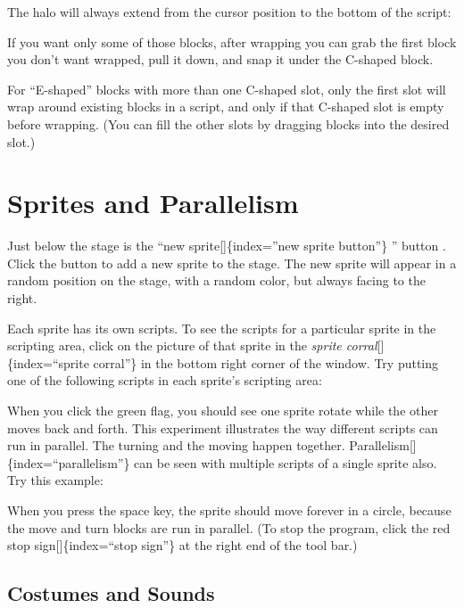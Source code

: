 \documentclass[
  letterpaper,
]{book}
\begin{document}
The halo will always extend from the cursor position to the bottom of
the script:

If you want only some of those blocks, after wrapping you can grab the
first block you don't want wrapped, pull it down, and snap it under the
C-shaped block.

For ``E-shaped'' blocks with more than one C-shaped slot, only the first
slot will wrap around existing blocks in a script, and only if that
C-shaped slot is empty before wrapping. (You can fill the other slots by
dragging blocks into the desired slot.)

\section{\texorpdfstring{\hl{ }Sprites and
Parallelism}{ Sprites and Parallelism}}\label{sprites-and-parallelism}

Just below the stage is the ``new sprite{[}{]}\{index=''new sprite
button''\} '' button . Click the button to add a new sprite to the
stage. The new sprite will appear in a random position on the stage,
with a random color, but always facing to the right.

Each sprite has its own scripts. To see the scripts for a particular
sprite in the scripting area, click on the picture of that sprite in the
\emph{sprite corral}{[}{]}\{index=``sprite corral''\} in the bottom
right corner of the window. Try putting one of the following scripts in
each sprite's scripting area:

\begin{quote}
\end{quote}

When you click the green flag, you should see one sprite rotate while
the other moves back and forth. This experiment illustrates the way
different scripts can run in parallel. The turning and the moving happen
together. Parallelism{[}{]}\{index=``parallelism''\} can be seen with
multiple scripts of a single sprite also. Try this example:

\begin{quote}
\end{quote}

When you press the space key, the sprite should move forever in a
circle, because the move and turn blocks are run in parallel. (To stop
the program, click the red stop sign{[}{]}\{index=``stop sign''\} at the
right end of the tool bar.)

\subsection{Costumes and Sounds}\label{costumes-and-sounds}
\end{document}
